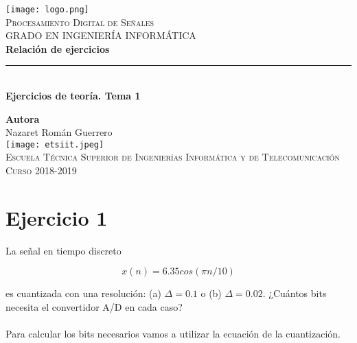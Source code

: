 \documentclass[11pt,a4paper]{article}
\begin{document}
\begin{titlepage}

\begin{minipage}{\textwidth}

\centering
\texttt{[image: logo.png]}\\

\textsc{\Large Procesamiento Digital de Señales\\[0.2cm]}
\textsc{GRADO EN INGENIERÍA INFORMÁTICA}\\[1cm]

{\Huge\bfseries Relación de ejercicios\\}
\noindent\rule[-1ex]{\textwidth}{3pt}\\[3.5ex]
{\large\bfseries Ejercicios de teoría. Tema 1}
\end{minipage}

\vspace{1.5cm}
\begin{minipage}{\textwidth}
\centering

\textbf{Autora}\\ {Nazaret Román Guerrero}\\[2.5ex]
\texttt{[image: etsiit.jpeg]}\\[0.1cm]
\vspace{1cm}
\textsc{Escuela Técnica Superior de Ingenierías Informática y de Telecomunicación}\\
\vspace{1cm}
\textsc{Curso 2018-2019}
\end{minipage}
\end{titlepage}

\tableofcontents
\thispagestyle{empty}

\newpage

\section{Ejercicio 1}

La señal en tiempo discreto

\[x(n)=6.35cos(\pi n/10) \]

es cuantizada con una resolución: (a) $\Delta = 0.1$ o (b) $\Delta = 0.02$. ¿Cuántos bits necesita el convertidor A/D en cada caso?\\ \\



Para calcular los bits necesarios vamos a utilizar la ecuación de la cuantización.
\end{document}
